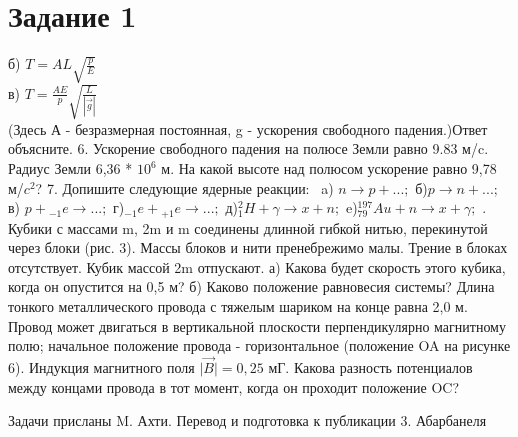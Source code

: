 \documentclass[12pt,onecolumn]{article}
\begin{document}
\section{Задание 1}
\begin{minipage}{0.3\textwidth}
    б) $T = AL\sqrt{\frac{p}{E}}$\\
    в) $T = \frac{AE}{p}\sqrt{\frac{L}{|\vec{g}|}}$\\
    (Здесь А - безразмерная постоянная, g - ускорения свободного падения.)Ответ объясните.
    \newline
    \hspace*{10mm}6. Ускорение свободного падения на полюсе Земли равно 9.83 м/c. Радиус Земли 6,36 * $10^6$ м.
На какой высоте над полюсом ускорение равно 9,78 м/$c^2$?
\newline
\hspace*{10mm}7. Допишите следующие ядерные реакции: \newline
\hspace*{10mm}  a) \hspace*{15mm} $n \rightarrow p + ...;$ \newline
                б)$p \rightarrow n + ...;$ \hspace*{2.5mm} 
                в) $p + {}_{-1}e \rightarrow ...;$
                г)${}_{-1}e + {}_{+1}e \rightarrow ...;$
                д)${}_1^2H + \gamma \rightarrow x + n;$
                e)${_{79}^{197}}Au + n \rightarrow x + \gamma;$ .
                Кубики с массами m, 2m и m соединены длинной гибкой нитью, перекинутой через блоки (рис. 3). Массы блоков и нити пренебрежимо малы. 
                Трение в блоках отсутствует. Кубик массой 2m отпускают. а) Какова будет скорость этого кубика, когда он опустится на 0,5 м? 
                б) Каково положение равновесия системы?\newline
                \hspace*{10mm} Длина тонкого металлического провода с тяжелым шариком на конце равна 2,0 м.
                Провод может двигаться в вертикальной плоскости перпендикулярно магнитному полю; начальное положение провода - горизонтальное
                (положение OA на рисунке 6). Индукция магнитного поля $|{\vec{B}|} = 0,25$ мГ. Какова разность потенциалов между концами провода в тот момент, когда он проходит положение OC?
                \begin{flushright}
                    Задачи присланы 
                    M. Ахти. Перевод 
                    и подготовка к 
                    публикации 3. Абарбанеля 
                \end{flushright}
\end{minipage}
\end{document}
